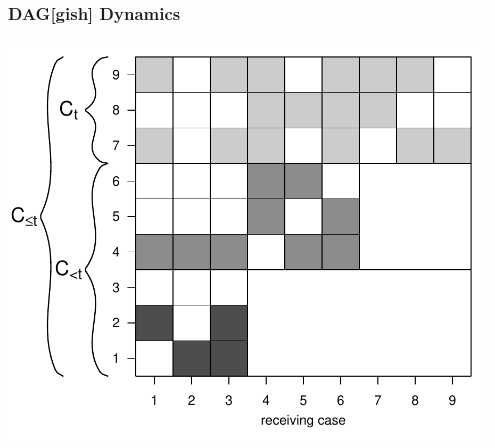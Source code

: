 \documentclass[handout]{beamer}
\begin{document}
\begin{frame} \frametitle{DAG[gish] Dynamics}
\centering

\includegraphics[width = 0.95\textwidth,trim= 0cm 0cm 0cm 0cm,clip=true  ]{../../../Tex/images/daggish.pdf}

\end{frame}
\end{document}
